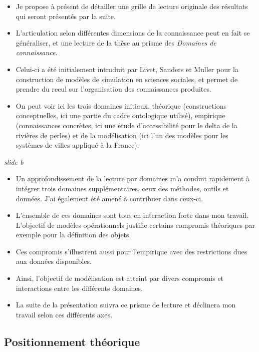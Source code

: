 \documentclass[12pt]{article}
\begin{document}
\begin{itemize}
	\item Je propose à présent de détailler une grille de lecture originale des résultats qui seront présentés par la suite.
	\item L'articulation selon différentes dimensions de la connaissance peut en fait se généraliser, et une lecture de la thèse au prisme des \emph{Domaines de connaissance}.
	\item Celui-ci a été initialement introduit par Livet, Sanders et Muller pour la construction de modèles de simulation en sciences sociales, et permet de prendre du recul sur l'organisation des connaissances produites.
	\item On peut voir ici les trois domaines initiaux, théorique (constructions conceptuelles, ici une partie du cadre ontologique utilisé), empirique (connaissances concrètes, ici une étude d'accessibilité pour le delta de la rivières de perles) et de la modélisation (ici l'un des modèles pour les systèmes de villes appliqué à la France).
\end{itemize}

\textit{slide b}

\begin{itemize}
\item Un approfondissement de la lecture par domaines m'a conduit rapidement à intégrer trois domaines supplémentaires, ceux des méthodes, outils et données. J'ai également été amené à contribuer dans ceux-ci.
	\item L'ensemble de ces domaines sont tous en interaction forte dans mon travail. L'objectif de modèles opérationnels justifie certains compromis théoriques par exemple pour la définition des objets.     
	\item Ces compromis s'illustrent aussi pour l'empirique avec des restrictions dues aux données disponibles.
	\item Ainsi, l'objectif de modélisation est atteint par divers compromis et interactions entre les différents domaines.
\item La suite de la présentation suivra ce prisme de lecture et déclinera mon travail selon ces différents axes.
\end{itemize}


\newpage


\subsection*{Positionnement théorique}
\end{document}
